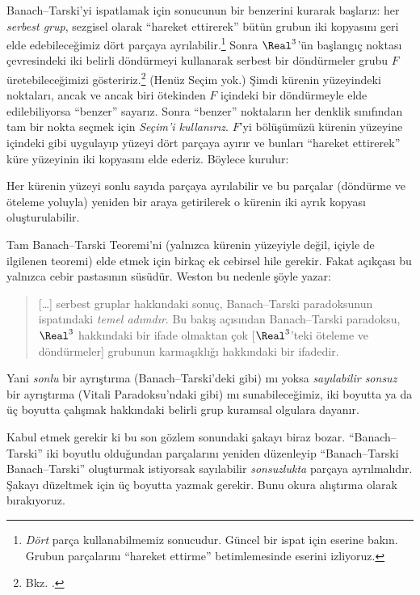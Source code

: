 Banach--Tarski'yi ispatlamak için  sonucunun bir
benzerini kurarak başlarız: her \emph{serbest grup}, sezgisel olarak
``hareket ettirerek'' bütün grubun iki kopyasını geri elde edebileceğimiz
dört parçaya ayrılabilir.\footnote{\emph{Dört} parça kullanabilmemiz
\cite{Robinson1947} sonucudur. Güncel bir ispat için
\citet[Theorem 5.2]{Wagon2016} eserine bakın. Grubun parçalarını
``hareket ettirme'' betimlemesinde \citet[p.~3]{Weston2003} eserini
izliyoruz.} Sonra $\Real^3$'ün başlangıç noktası çevresindeki iki belirli
döndürmeyi kullanarak serbest bir döndürmeler grubu $F$ üretebileceğimizi
gösteririz.\footnote{Bkz. \citet[Theorem 2.1]{Wagon2016}.} (Henüz Seçim
yok.) Şimdi kürenin yüzeyindeki noktaları, ancak ve ancak biri ötekinden
$F$ içindeki bir döndürmeyle elde edilebiliyorsa ``benzer'' sayarız. Sonra
``benzer'' noktaların her denklik sınıfından tam bir nokta seçmek için
\emph{Seçim'i kullanırız}. $F$'yi bölüşümüzü kürenin yüzeyine
 içindeki gibi uygulayıp yüzeyi dört parçaya
ayırır ve bunları ``hareket ettirerek'' küre yüzeyinin iki kopyasını elde
ederiz. Böylece \citep{Hausdorff1914} kurulur:

\begin{thm}
Her kürenin yüzeyi sonlu sayıda parçaya ayrılabilir ve bu parçalar
(döndürme ve öteleme yoluyla) yeniden bir araya getirilerek o kürenin iki
ayrık kopyası oluşturulabilir.
\end{thm}

Tam Banach--Tarski Teoremi'ni (yalnızca kürenin yüzeyiyle değil, içiyle de
ilgilenen teoremi) elde etmek için birkaç ek cebirsel hile gerekir. Fakat
açıkçası bu yalnızca cebir pastasının süsüdür. Weston bu nedenle şöyle
yazar:
\begin{quote}
  [\ldots] serbest gruplar hakkındaki sonuç, Banach--Tarski paradoksunun
  ispatındaki \emph{temel adımdır}. Bu bakış açısından Banach--Tarski
  paradoksu, $\Real^3$ hakkındaki bir ifade olmaktan çok [$\Real^3$'teki
  öteleme ve döndürmeler] grubunun karmaşıklığı hakkındaki bir ifadedir.
  \cite[p.~16]{Weston2003}
\end{quote}
Yani \emph{sonlu} bir ayrıştırma (Banach--Tarski'deki gibi) mı yoksa
\emph{sayılabilir sonsuz} bir ayrıştırma (Vitali Paradoksu'ndaki gibi) mı
sunabileceğimiz, iki boyutta ya da üç boyutta çalışmak hakkındaki belirli
grup kuramsal olgulara dayanır.

Kabul etmek gerekir ki bu son gözlem  sonundaki şakayı
biraz bozar. ``Banach--Tarski'' iki boyutlu olduğundan parçalarını yeniden
düzenleyip ``Banach--Tarski Banach--Tarski'' oluşturmak istiyorsak
sayılabilir \emph{sonsuzlukta} parçaya ayrılmalıdır. Şakayı düzeltmek için
üç boyutta yazmak gerekir. Bunu okura alıştırma olarak bırakıyoruz.

